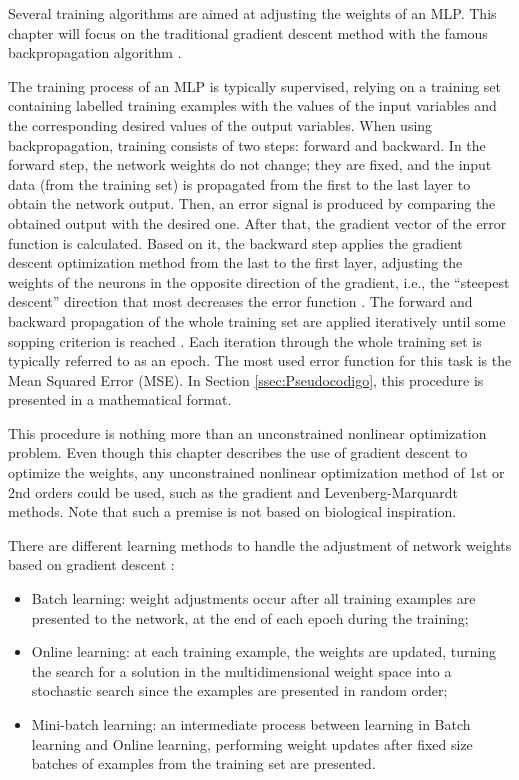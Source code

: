 Several training algorithms are aimed at adjusting the weights of an MLP. This chapter will focus on the traditional gradient descent method with the famous backpropagation algorithm \cite{rumelhart1986learning}.

The training process of an MLP is typically supervised, relying on a training set containing labelled training examples with the values of the input variables and the corresponding desired values of the output variables. When using backpropagation, training consists of two steps: forward and backward. In the forward step, the network weights do not change; they are fixed, and the input data (from the training set) is propagated from the first to the last layer to obtain the network output. Then, an error signal is produced by comparing the obtained output with the desired one. After that, the gradient vector of the error function is calculated. Based on it, the backward step applies the gradient descent optimization method from the last to the first layer, adjusting the weights of the neurons in the opposite direction of the gradient, i.e., the ``steepest descent'' direction that most decreases the error function \cite{haykin}. The forward and backward propagation of the whole training set are applied iteratively until some sopping criterion is reached \cite{Castro2006FundamentalsON}. Each iteration through the whole training set is typically referred to as an epoch. The most used error function for this task is the Mean Squared Error (MSE).  In Section \ref{ssec:Pseudocodigo}, this procedure is presented in a mathematical format. 

This procedure is nothing more than an unconstrained nonlinear optimization problem. Even though this chapter describes the use of gradient descent to optimize the weights, any unconstrained nonlinear optimization method of 1st or 2nd orders could be used, such as the gradient and Levenberg-Marquardt methods. Note that such a premise is not based on biological inspiration.

There are different learning methods to handle the adjustment of network weights based on gradient descent \cite{haykin, Bengio2012}:

\begin{itemize}
	\item Batch learning: weight adjustments occur after all training examples are presented to the network, at the end of each epoch during the training;
	\item Online learning: at each training example, the weights are updated, turning the search for a solution in the multidimensional weight space into a stochastic search since the examples are presented in random order;
	\item Mini-batch learning: an intermediate process between learning in Batch learning and Online learning, performing weight updates after fixed size batches of examples from the training set are presented.
\end{itemize}




